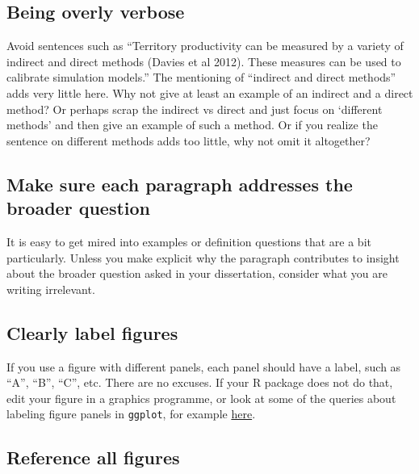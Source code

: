 \documentclass[
]{book}
\begin{document}
\hypertarget{being-overly-verbose}{%
\subsection{Being overly verbose}\label{being-overly-verbose}}

Avoid sentences such as ``Territory productivity can be measured by a variety of
indirect and direct methods (Davies et al 2012). These measures
can be used to calibrate simulation models.'' The mentioning of
``indirect and direct methods'' adds very little here. Why not give at least an
example of an indirect and a direct method? Or perhaps scrap the indirect vs direct and
just focus on `different methods' and then give an example of such a method.
Or if you realize the sentence on different methods adds too little, why not omit it altogether?

\hypertarget{make-sure-each-paragraph-addresses-the-broader-question}{%
\subsection{Make sure each paragraph addresses the broader question}\label{make-sure-each-paragraph-addresses-the-broader-question}}

It is easy to get mired into examples or definition questions that are a bit particularly. Unless you
make explicit why the paragraph contributes to insight about the broader question
asked in your dissertation, consider what you are writing irrelevant.

\hypertarget{clearly-label-figures}{%
\subsection{Clearly label figures}\label{clearly-label-figures}}

If you use a figure with different panels, each panel should have a label, such
as ``A'', ``B'', ``C'', etc. There are no excuses. If your R package does not do that,
edit your figure in a graphics programme, or look at some of the queries about
labeling figure panels in \texttt{ggplot}, for example \href{https://stackoverflow.com/questions/17576381/label-individual-panels-in-a-multi-panel-ggplot2}{here}.

\hypertarget{reference-all-figures}{%
\subsection{Reference all figures}\label{reference-all-figures}}
\end{document}

